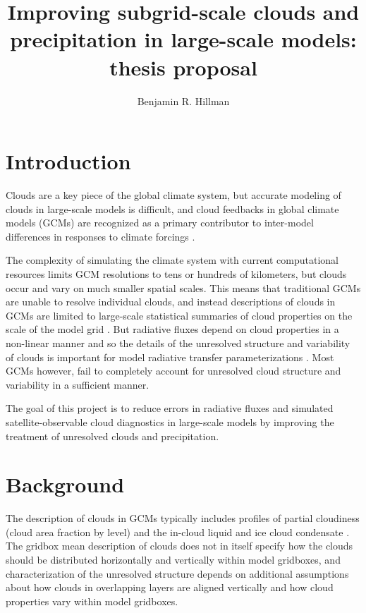 \documentclass[letter]{article}
\author{Benjamin R. Hillman}
\title{Improving subgrid-scale clouds and precipitation in large-scale models: thesis proposal}
\begin{document}
\maketitle
\section{Introduction}

Clouds are a key piece of the global climate system, but accurate modeling of clouds in large-scale models is difficult, and cloud feedbacks in global climate models (GCMs) are recognized as a primary contributor to inter-model differences in responses to climate forcings \citep[e.g.,][]{cess_et_al_1990,bony_and_dufresne_2005,williams_and_webb_2009,medeiros_et_al_2008}.

The complexity of simulating the climate system with current computational resources limits GCM resolutions to tens or hundreds of kilometers, but clouds occur and vary on much smaller spatial scales. This means that traditional GCMs are unable to resolve individual clouds, and instead descriptions of clouds in GCMs are limited to large-scale statistical summaries of cloud properties on the scale of the model grid \citep{randall_et_al_2003}. But radiative fluxes depend on cloud properties in a non-linear manner and so the details of the unresolved structure and variability of clouds is important for model radiative transfer parameterizations \citep[e.g.][]{barker_et_al_1999}. Most GCMs however, fail to completely account for unresolved cloud structure and variability in a sufficient manner.

The goal of this project is to reduce errors in radiative fluxes and simulated satellite-observable cloud diagnostics in large-scale models by improving the treatment of unresolved clouds and precipitation.

\section{Background}
The description of clouds in GCMs typically includes profiles of partial cloudiness (cloud area fraction by level) and the in-cloud liquid and ice cloud condensate \citep[e.g.][]{cam3_description,cam4_description}. The gridbox mean description of clouds does not in itself specify how the clouds should be distributed horizontally and vertically within model gridboxes, and characterization of the unresolved structure depends on additional assumptions about how clouds in overlapping layers are aligned vertically and how cloud properties vary within model gridboxes.
\end{document}
